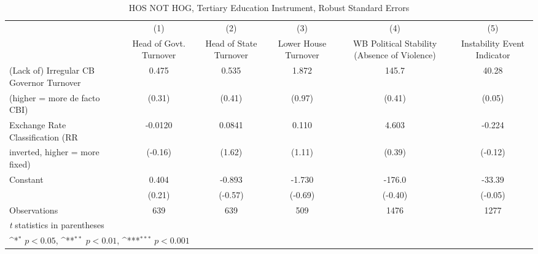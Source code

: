 \begin{table}[htbp]\centering
\def\sym#1{\ifmmode^{#1}\else\(^{#1}\)\fi}
\caption{HOS NOT HOG, Tertiary Education Instrument, Robust Standard Errors \label{NOhoshogIfivs2}}
\begin{tabular}{l*{5}{c}}
\toprule
                                        &\multicolumn{1}{c}{(1)}&\multicolumn{1}{c}{(2)}&\multicolumn{1}{c}{(3)}&\multicolumn{1}{c}{(4)}&\multicolumn{1}{c}{(5)}\\
                                        &\multicolumn{1}{c}{Head of Govt. Turnover}&\multicolumn{1}{c}{Head of State Turnover}&\multicolumn{1}{c}{Lower House Turnover}&\multicolumn{1}{c}{WB Political Stability (Absence of Violence)}&\multicolumn{1}{c}{Instability Event Indicator}\\
\midrule
(Lack of) Irregular CB Governor Turnover&    0.475         &    0.535         &    1.872         &    145.7         &    40.28         \\
(higher = more de facto CBI)            &   (0.31)         &   (0.41)         &   (0.97)         &   (0.41)         &   (0.05)         \\
\addlinespace
Exchange Rate Classification (RR        &  -0.0120         &   0.0841         &    0.110         &    4.603         &   -0.224         \\
inverted, higher = more fixed)          &  (-0.16)         &   (1.62)         &   (1.11)         &   (0.39)         &  (-0.12)         \\
\addlinespace
Constant                                &    0.404         &   -0.893         &   -1.730         &   -176.0         &   -33.39         \\
                                        &   (0.21)         &  (-0.57)         &  (-0.69)         &  (-0.40)         &  (-0.05)         \\
\midrule
Observations                            &      639         &      639         &      509         &     1476         &     1277         \\
\bottomrule
\multicolumn{6}{l}{\footnotesize \textit{t} statistics in parentheses}\\
\multicolumn{6}{l}{\footnotesize \sym{*} \(p<0.05\), \sym{**} \(p<0.01\), \sym{***} \(p<0.001\)}\\
\end{tabular}
\end{table}
